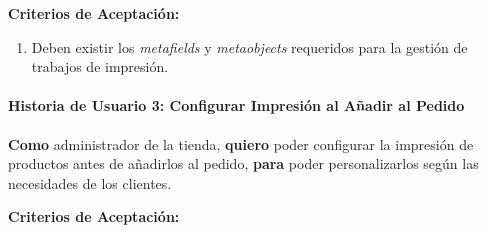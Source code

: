 \documentclass[12pt]{article}
\newcommand{\subsubsubsection}[1]{\paragraph{#1}}
\begin{document}
\vspace{0.5cm}
\textbf{Criterios de Aceptación:}
\begin{enumerate}[label=\arabic*.]
    \item Deben existir los \textit{metafields} y \textit{metaobjects} requeridos para la gestión de trabajos de impresión.
\end{enumerate}


\subsubsubsection{Historia de Usuario 3: Configurar Impresión al Añadir al Pedido}\label{sec:historia3}

\textbf{Como} administrador de la tienda, \textbf{quiero} poder configurar la impresión de productos antes de añadirlos al pedido, \textbf{para} poder personalizarlos según las necesidades de los clientes.

\vspace{0.5cm}
\textbf{Criterios de Aceptación:}
\end{document}
